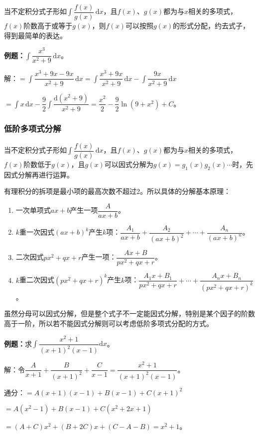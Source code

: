 \documentclass[UTF8, 12pt]{ctexart}
\begin{document}
当不定积分式子形如$\displaystyle{\int\dfrac{f(x)}{g(x)}\,\textrm{d}x}$，且$f(x)$、$g(x)$都为与$x$相关的多项式，$f(x)$阶数高于或等于$g(x)$，则$f(x)$可以按照$g(x)$的形式分配，约去式子，得到最简单的表达。

\textbf{例题：}$\displaystyle{\int\dfrac{x^3}{x^2+9}\,\textrm{d}x}$。 \medskip

解：$=\displaystyle{\int\dfrac{x^3+9x-9x}{x^2+9}\,\textrm{d}x=\int\dfrac{x^3+9x}{x^2+9}\,\textrm{d}x-\int\dfrac{9x}{x^2+9}\,\textrm{d}x}$ \medskip

$\displaystyle{=\int x\,\textrm{d}x-\dfrac{9}{2}\int\dfrac{\textrm{d}(x^2+9)}{x^2+9}}=\dfrac{x^2}{2}-\dfrac{9}{2}\ln(9+x^2)+C$。

\subsubsection{低阶多项式分解}

当不定积分式子形如$\displaystyle{\int\dfrac{f(x)}{g(x)}\,\textrm{d}x}$，且$f(x)$、$g(x)$都为与$x$相关的多项式，$f(x)$阶数低于$g(x)$，且$g(x)$可以因式分解为$g(x)=g_1(x)g_2(x)\cdots$时，先因式分解再进行运算。

有理积分的拆项是最小项的最高次数不超过2。所以具体的分解基本原理：

\begin{enumerate}
    \item 一次单项式$ax+b$产生一项$\dfrac{A}{ax+b}$。
    \item $k$重一次因式$(ax+b)^k$产生$k$项：$\dfrac{A_1}{ax+b}+\dfrac{A_2}{(ax+b)^2}+\cdots+\dfrac{A_n}{(ax+b)^n}$。
    \item 二次因式$px^2+qx+r$产生一项：$\dfrac{Ax+B}{px^2+qx+r}$。
    \item $k$重二次因式$(px^2+qx+r)^k$产生$k$项：$\dfrac{A_1x+B_1}{px^2+qx+r}+\cdots+\dfrac{A_nx+B_n}{(px^2+qx+r)^k}$。
\end{enumerate}

虽然分母可以因式分解，但是整个式子不一定能因式分解，特别是某个因子的阶数高于一阶，所以若不能因式分解则可以考虑低阶多项式分配的方式。

\textbf{例题：}求$\displaystyle{\int\dfrac{x^2+1}{(x+1)^2(x-1)}\textrm{d}x}$。\medskip

解：令$\dfrac{A}{x+1}+\dfrac{B}{(x+1)^2}+\dfrac{C}{x-1}=\dfrac{x^2+1}{(x+1)^2(x-1)}$。 \medskip

通分：$=A(x+1)(x-1)+B(x-1)+C(x+1)^2$

$=A(x^2-1)+B(x-1)+C(x^2+2x+1)$

$=(A+C)x^2+(B+2C)x+(C-A-B)=x^2+1$。
\end{document}
